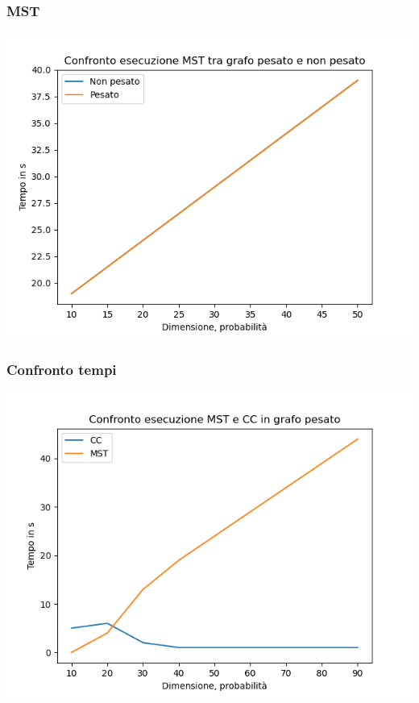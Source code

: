 \documentclass[
]{article}
\begin{document}
\hypertarget{MST}{%
	\subsubsection{MST}\label{MST}}
\includegraphics{../img/mst.png}
\hypertarget{componenti-connesse-1}{%
	\subsubsection{Confronto tempi}\label{confronto tempi}}
\includegraphics{../img/time.png}
\end{document}
